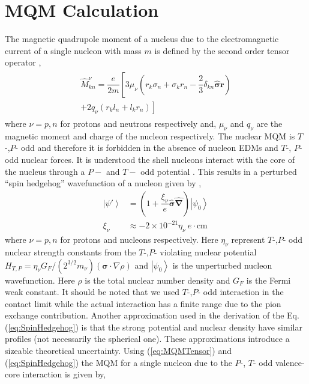 \documentclass[8pt,a4paper, twoside]{report}
\begin{document}
\fi
\section{MQM  Calculation}
The magnetic quadrupole moment of a nucleus due to the electromagnetic current of a single nucleon with mass $m$ is defined by the second order tensor operator \cite{SFK1984},
\begin{align} \label{eq:MQMTensor}
\begin{split}
\hat{M}_{kn}^{\nu} = \dfrac{e}{2m}\left[3\mu_{\nu}\left(r_k\sigma_n + \sigma_kr_n - \dfrac{2}{3}\delta_{kn}\hat{\boldsymbol{\sigma}}\textbf{r}\right) \right. \\
\left. + 2q_{\nu}\left(r_kl_n + l_kr_n\right)\right]
\end{split}
\end{align}
where $\nu = p,n$ for protons and neutrons respectively and, $\mu_{\nu}$ and $q_{\nu}$ are the magnetic moment and charge of the nucleon respectively. The nuclear MQM is $T$-,$P$- odd and therefore it is forbidden in the absence of nucleon EDMs and $T$-, $P$- odd nuclear forces. It is understood the shell nucleons interact with the core of the nucleus through a $P-$ and $T-$ odd potential \cite{Flambaum1994, SFK1984, KhriplovichPNC}. This results in a perturbed ``spin hedgehog'' wavefunction of a nucleon given by \cite{SFK1984, Flambaum1994},
\begin{align} \label{eq:SpinHedgehog}
\left|\psi'\right> &= \left(1 + \dfrac{\xi_{\nu}}{e}\hat{\boldsymbol{\sigma}}\hat{\boldsymbol{\nabla}}\right)\left|\psi_0\right> \\
\xi_{\nu} &\approx -2\times 10^{-21}\eta_{\nu} \ e\cdot\text{cm} \nonumber
\end{align}
where $\nu = p,n$ for protons and nucleons respectively. Here $\eta_{\nu}$ represent $T$-,$P$- odd nuclear strength constants from the $T$-,$P$- violating nuclear potential $H_{T,P} = \eta_{\nu}G_{F}/(2^{3/2}m_{\nu})(\boldsymbol{\sigma}\cdot \nabla\rho)$ and $\left|\psi_0\right>$ is the unperturbed nucleon wavefunction. Here $\rho$ is the total nuclear number density and $G_{F}$ is the Fermi weak constant.  It should be noted that we used   $T$-,$P$- odd interaction in the contact limit while the actual interaction has a finite range due to the pion exchange contribution. Another approximation used in the derivation of the Eq. (\ref{eq:SpinHedgehog}) is that the strong potential and nuclear density have similar profiles (not necessarily the  spherical one). These approximations introduce a sizeable theoretical uncertainty.  Using (\ref{eq:MQMTensor}) and (\ref{eq:SpinHedgehog}) the MQM for a single nucleon due to the $P$-, $T$- odd valence-core interaction is given by,
\end{document}
